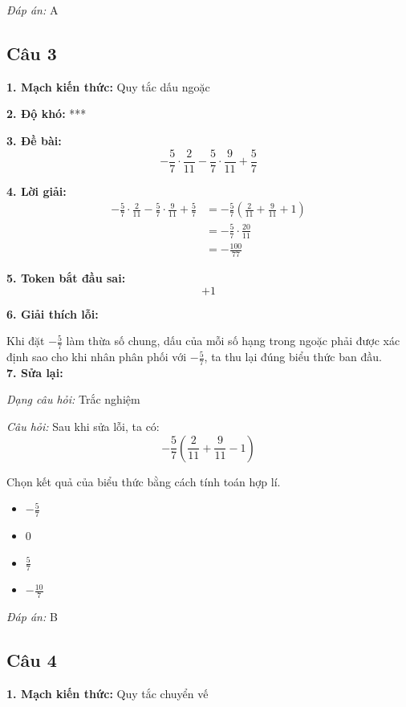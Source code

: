\textit{Đáp án:} A

\subsection*{Câu 3}

\noindent\textbf{1. Mạch kiến thức:} Quy tắc dấu ngoặc

\noindent\textbf{2. Độ khó:} ***

\noindent\textbf{3. Đề bài:}
\[
-\frac{5}{7}\cdot\frac{2}{11}
-\frac{5}{7}\cdot\frac{9}{11}
+\frac{5}{7}
\]

\noindent\textbf{4. Lời giải:}
\begin{align*}
-\frac{5}{7}\cdot\frac{2}{11}
-\frac{5}{7}\cdot\frac{9}{11}
+\frac{5}{7}
&=
-\frac{5}{7}\left(\frac{2}{11}+\frac{9}{11}+1\right) \\
&=
-\frac{5}{7}\cdot\frac{20}{11} \\
&=
-\frac{100}{77}
\end{align*}

\noindent\textbf{5. Token bắt đầu sai:}
\[
+1
\]

\noindent\textbf{6. Giải thích lỗi:}

Khi đặt $-\frac{5}{7}$ làm thừa số chung, dấu của mỗi số hạng trong ngoặc phải được xác định sao cho khi nhân phân phối với $-\frac{5}{7}$, ta thu lại đúng biểu thức ban đầu.\\
\noindent\textbf{7. Sửa lại:}

\textit{Dạng câu hỏi:} Trắc nghiệm

\textit{Câu hỏi:} Sau khi sửa lỗi, ta có:
\[
-\frac{5}{7}\left(\frac{2}{11}+\frac{9}{11}-1\right)
\]

Chọn kết quả của biểu thức bằng cách tính toán hợp lí.

\begin{itemize}
    \item[A.] $-\frac{5}{7}$
    \item[B.] $0$
    \item[C.] $\frac{5}{7}$
    \item[D.] $-\frac{10}{7}$
\end{itemize}

\textit{Đáp án:} B

\subsection*{Câu 4}

\noindent\textbf{1. Mạch kiến thức:} Quy tắc chuyển vế

